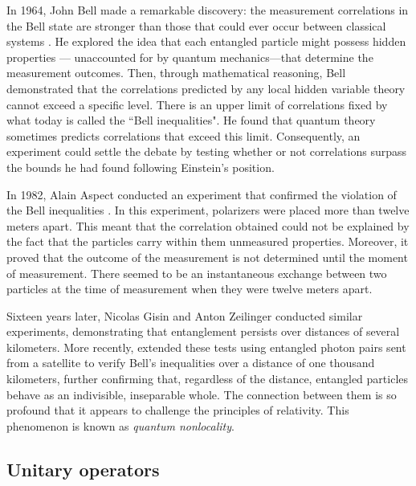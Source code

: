 In 1964, John Bell made a remarkable discovery: the measurement correlations in the Bell state are stronger than those that could ever occur between  classical systems \cite{bell1964einstein}. He explored the idea that each entangled particle might possess hidden properties — unaccounted for by quantum mechanics—that determine the measurement outcomes. Then, through mathematical reasoning, Bell demonstrated that the correlations predicted by any local hidden variable theory cannot exceed a specific level.  There is an upper limit of correlations fixed by what today is called the ``Bell inequalities". He found that quantum theory sometimes predicts correlations that exceed this limit. Consequently, an experiment could  settle the debate by testing whether or not correlations surpass the bounds he had found following Einstein's position.


In 1982, Alain Aspect conducted an experiment that confirmed the violation of the Bell inequalities \cite{aspect1982experimental}. In this experiment, polarizers were placed more than twelve meters apart. This meant that the correlation obtained could not be explained by the fact that the particles carry within them unmeasured properties. Moreover, it proved that the outcome of the measurement is not determined until the moment of measurement. There seemed to be an instantaneous exchange between two particles at the time of measurement when they were twelve meters apart.



Sixteen years later, Nicolas Gisin \cite{tittel1998experimental} and Anton Zeilinger \cite{pan1998experimental} conducted similar experiments, demonstrating that entanglement persists over distances of several kilometers. More recently,  \cite{yin2017satellite} extended these tests using entangled photon pairs sent from a satellite to verify Bell's inequalities over a distance of one thousand kilometers, further confirming that, regardless of the distance, entangled particles behave as an indivisible, inseparable whole. The connection between them is so profound that it appears to challenge the principles of relativity. This phenomenon is known as \emph{quantum nonlocality}.

\subsection{Unitary operators}\label{subsec:unitary-operators}




